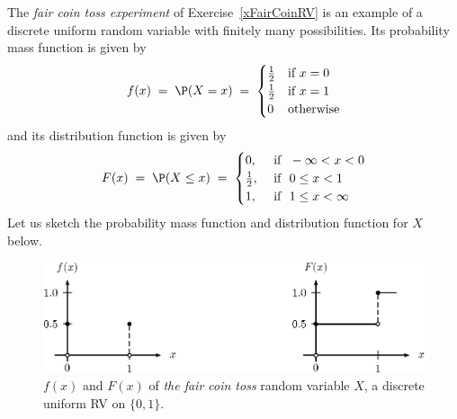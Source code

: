 \begin{example}\label{ExFairCoinRV}
The {\em fair coin toss experiment} of Exercise~\ref{xFairCoinRV} is an example of a discrete uniform random variable with finitely many possibilities. 
Its probability mass function is given by 
\[f(x)\;=\;\P(X=x)\;=\;
\begin{cases}
\frac{1}{2} & \text{if } x=0\\
\frac{1}{2} & \text{if } x=1\\
0 & \text{otherwise}
\end{cases}\] 
and its distribution function is given by
\[F(x)\; = \;\P(X \leq x) \;=\;
\begin{cases}
 0, & \text{ if } \ -\infty < x < 0\\
 \frac{1}{2}, & \text{ if } \ 0 \leq x < 1\\
 1,
& \text{ if } \ 1 \leq x < \infty
\end{cases}
\]
Let us sketch the probability mass function and distribution function for $X$ below. 
\begin{figure}[htbp]
\begin{center}
\includegraphics{pstricks/faircoinfF}
\caption{$f(x)$ and $F(x)$ of {\em the fair coin toss} random variable $X$, a discrete uniform RV on $\{0,1\}$.}
\end{center}
\end{figure}
\end{example}


